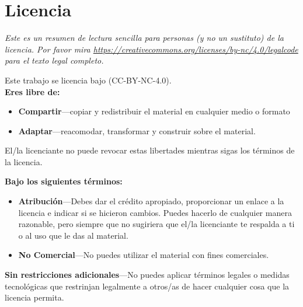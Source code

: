 \chapter{Licencia}\label{s:license}

{\setlength{\parindent}{0em}

\emph{
  Este es un resumen de lectura sencilla para personas (y no un sustituto) de la licencia.
  Por favor mira \url{https://creativecommons.org/licenses/by-nc/4.0/legalcode} para el texto legal completo.
}

\vspace{\baselineskip}

\noindent
Este trabajo se licencia bajo
(CC-BY-NC-4.0).\\

\noindent
\textbf{Eres libre de:}

\begin{itemize}
\item
  \textbf{Compartir}---copiar y redistribuir el material en cualquier medio o
  formato
\item
  \textbf{Adaptar}---reacomodar, transformar y construir sobre el material.
\end{itemize}

El/la licenciante no puede revocar estas libertades mientras sigas los
términos de la licencia.

\vspace{\baselineskip}

\textbf{Bajo los siguientes términos:}

\begin{itemize}
\item
  \textbf{Atribución}---Debes dar el crédito apropiado, proporcionar un enlace
  a la licencia e indicar si se hicieron cambios. Puedes hacerlo de cualquier manera
  razonable, pero siempre que no sugiriera que el/la licenciante te respalda 
  a ti o al uso que le das al material.\\
\item
  \textbf{No Comercial}---No puedes utilizar el material con fines comerciales.
\end{itemize}

\textbf{Sin restricciones adicionales}---No puedes aplicar términos legales o
medidas tecnológicas que restrinjan legalmente a otros/as de hacer cualquier cosa
que la licencia permita.

\vspace{\baselineskip}

}
